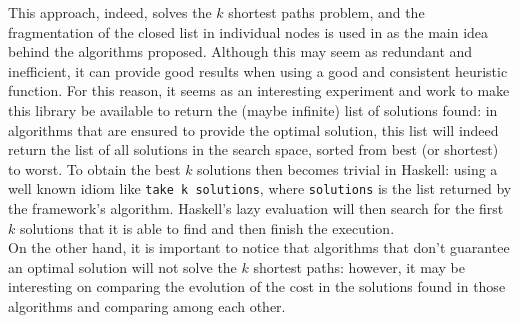 This approach, indeed, solves the $k$ shortest paths problem, and the
fragmentation of the closed list in individual nodes is used in
\cite{dechter-2012-search} as the main idea behind the algorithms proposed.
Although this may seem as redundant and inefficient, it can provide good
results when using a good and consistent heuristic function. For this reason,
it seems as an interesting experiment and work to make this library be
available to return the (maybe infinite) list of solutions found: in algorithms
that are ensured to provide the optimal solution, this list will indeed return
the list of all solutions in the search space, sorted from best (or shortest)
to worst. To obtain the best $k$ solutions then becomes trivial in Haskell:
using a well known idiom like \texttt{take k solutions}, where
\texttt{solutions} is the list returned by the framework's algorithm. Haskell's
lazy evaluation will then search for the first $k$ solutions that it is able to
find and then finish the execution.\\

On the other hand, it is important to notice that algorithms that don't
guarantee an optimal solution will not solve the $k$ shortest paths: however,
it may be interesting on comparing the evolution of the cost in the solutions
found in those algorithms and comparing among each other.\\

\newpage